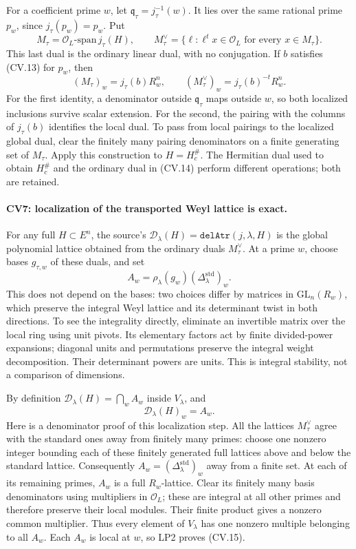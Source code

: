 For a coefficient prime \(w\), let
\(\mathfrak q_\tau=j_\tau^{-1}(w)\).
It lies over the same rational prime \(p_w\), since
\(j_\tau(p_w)=p_w\). Put
\[
 M_\tau=\mathcal O_L\text{-span}\,j_\tau(H),\qquad
 M_\tau^\vee=\{\ell:\ell^tx\in\mathcal O_L
                                  \text{ for every }x\in M_\tau\}.
\]
This last dual is the ordinary linear dual, with no
conjugation. If \(b\) satisfies (CV.13) for \(p_w\), then
\[
 (M_\tau)_w=j_\tau(b)R_w^n,\qquad
 (M_\tau^\vee)_w=j_\tau(b)^{-t}R_w^n.                          \tag{CV.14}
\]
For the first identity, a denominator outside
\(\mathfrak q_\tau\) maps outside \(w\), so both localized
inclusions survive scalar extension. For the second, the
pairing with the columns of \(j_\tau(b)\) identifies the
local dual. To pass from local pairings to the localized
global dual, clear the finitely many pairing denominators
on a finite generating set of \(M_\tau\).
Apply this construction to \(H=H_c^\#\).
The Hermitian dual used to obtain \(H_c^\#\) and the
ordinary dual in (CV.14) perform different operations;
both are retained.

\paragraph{CV7: localization of the transported Weyl lattice is exact.}
For any full \(H\subset E^n\), the source's
\(\mathcal D_\lambda(H)=\texttt{delAtr}(j,\lambda,H)\)
is the global polynomial lattice obtained from the ordinary
duals \(M_\tau^\vee\). At a prime \(w\), choose bases
\(g_{\tau,w}\) of these duals, and set
\[
 A_w=\rho_\lambda(g_w)
                      (\Delta_\lambda^{\mathrm{std}})_w.
\]
This does not depend on the bases: two choices differ by
matrices in \(\mathrm{GL}_n(R_w)\), which preserve the
integral Weyl lattice and its determinant twist in both
directions. To see the integrality directly, eliminate
an invertible matrix over the local ring using unit pivots.
Its elementary factors act by finite divided-power
expansions; diagonal units and permutations preserve the
integral weight decomposition. Their determinant powers
are units. This is integral stability, not a comparison
of dimensions.

By definition \(\mathcal D_\lambda(H)=\bigcap_w A_w\)
inside \(V_\lambda\), and
\[
                   \mathcal D_\lambda(H)_w=A_w.              \tag{CV.15}
\]
Here is a denominator proof of this localization step.
All the lattices \(M_\tau^\vee\) agree with the standard
ones away from finitely many primes: choose one nonzero
integer bounding each of these finitely generated full
lattices above and below the standard lattice.
Consequently \(A_w=(\Delta_\lambda^{\mathrm{std}})_w\)
away from a finite set. At each of its remaining primes,
\(A_w\) is a full \(R_w\)-lattice. Clear its finitely many
basis denominators using multipliers in \(\mathcal O_L\);
these are integral at all other primes and therefore
preserve their local modules. Their finite product gives
a nonzero common multiplier.
Thus every element of \(V_\lambda\) has one nonzero
multiple belonging to all \(A_w\). Each \(A_w\) is local
at \(w\), so LP2 proves (CV.15).

